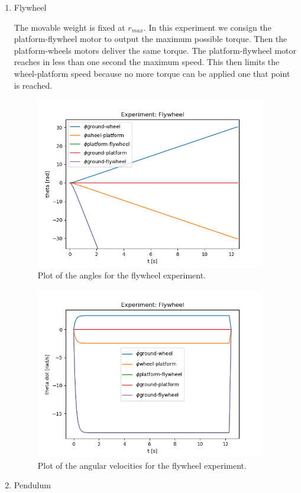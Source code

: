 \begin{enumerate}
	\item Flywheel
	
		The movable weight is fixed at $r_{max}$. In this experiment we consign the platform-flywheel motor to 
		output the maximum possible torque. Then the platform-wheels motors deliver
		the same torque. The platform-flywheel motor reaches in less than one second
		the maximum speed. This then limits the wheel-platform speed because no
		more torque can be applied one that point is reached.
	      \begin{figure}[H]
		      \centering
		      \includegraphics[width=10cm]{img/lagrange_5/flywheel_q.png}
		      \caption{Plot of the angles for the flywheel experiment.}
		      \label{fig:Simulation flywheel q}
	      \end{figure}


	      \begin{figure}[H]
		      \centering
		      \includegraphics[width=10cm]{img/lagrange_5/flywheel_q_dot.png}
		      \caption{Plot of the angular velocities for the flywheel experiment.}
		      \label{fig:Simulation flywheel q dot}
	      \end{figure}
	\item Pendulum
	

\end{enumerate}
